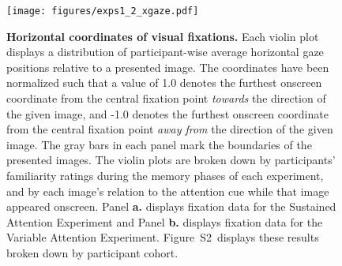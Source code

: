 \documentclass[english]{article}
\newcommand{\fixation}{S2}
\begin{document}
\begin{figure}[tp]
  \centering
  \texttt{[image: figures/exps1\_2\_xgaze.pdf]}

  \caption{\textbf{Horizontal coordinates of visual fixations.} Each violin
  plot displays a distribution of participant-wise average horizontal gaze
  positions relative to a presented image. The coordinates have been normalized
  such that a value of 1.0 denotes the furthest onscreen coordinate from the
  central fixation point \textit{towards} the direction of the given image, and
  -1.0 denotes the furthest onscreen coordinate from the central fixation point
  \textit{away from} the direction of the given image. The gray bars in each
  panel mark the boundaries of the presented images. The violin plots are
  broken down by participants' familiarity ratings during the memory phases of
  each experiment, and by each image's relation to the attention cue while that
  image appeared onscreen. Panel \textbf{a.} displays fixation data for the
  Sustained Attention Experiment and Panel \textbf{b.} displays fixation data
  for the Variable Attention Experiment. Figure~\fixation~displays these
  results broken down by participant cohort.}

\label{fig:fixation}
\end{figure}
\end{document}

